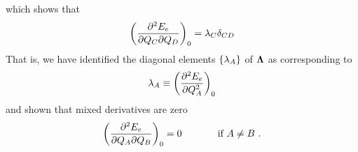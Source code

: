 \documentclass[11pt]{article}
\begin{document}
which shows that
\begin{align}
%
	\pr{\fr{\pt^2E_e}{\pt Q_C\pt Q_D}}_0
=
	\la_C\d_{CD}
\end{align}
That is, we have identified the diagonal elements $\{\lambda_A\}$ of $\bm{\Lambda}$ as corresponding to
\begin{align}
	\lambda_A \equiv \left( \dfrac{ \partial^{2} E_e }{\partial Q_A ^{2}}\right)_0
\end{align}
and shown that mixed derivatives are zero
\begin{align}
	\left(\dfrac{\partial^2E_e}{\partial Q_A\partial Q_B}\right)_0
=
	0
\ \ \ \ \ \ \ \ \ \ 
	\text{ if } A\neq B \ .
\end{align}






\end{document}
